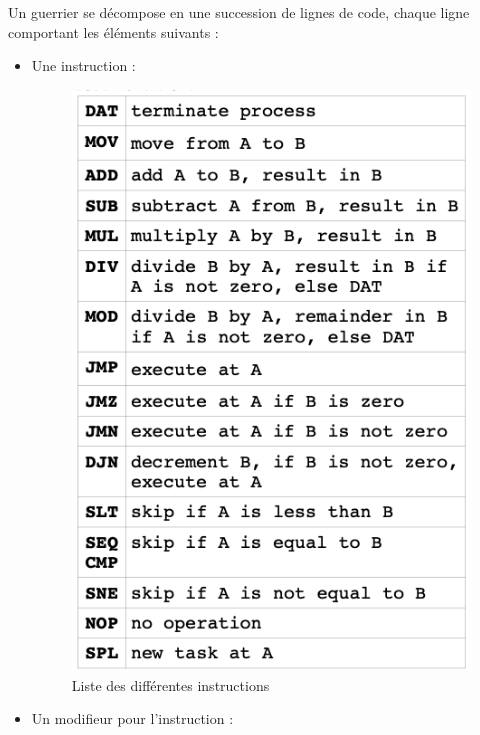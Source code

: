 \documentclass[french]{article}
\begin{document}
        Un guerrier se décompose en une succession de lignes de code, chaque ligne comportant les éléments suivants : 
        \begin{itemize}
            \item Une instruction : 
                \begin{figure}[!h]
                    \centering \includegraphics[scale=0.4]{image/instruction.png}
                    \caption{Liste des différentes instructions}
                \end{figure}
            \newpage
            \item Un modifieur pour l'instruction :
                \begin{figure}[!h]
                    \centering 

\end{figure}
\end{itemize}
\end{document}
